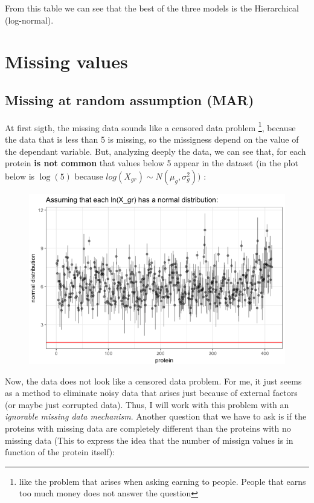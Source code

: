 \documentclass{article}
\begin{document}
From this table we can see that the best of the three models is the Hierarchical (log-normal).


\section{Missing values}
\subsection*{Missing at random assumption (MAR)}

At first sigth, the missing data sounds like a censored data problem \footnote{like the problem that arises when asking earning to people. People that earns too much money does not answer the question}, because the data that is less than 5 is missing, so the missigness depend on the value of the dependant variable. But, analyzing deeply the data, we can see that, for each protein \textbf{is not common} that values below 5 appear in the dataset (in the plot below is $\log(5)$ because $log(X_{gr}) \sim N(\mu_g, \sigma_g^2))$ :

\begin{figure}[ht!]
\centering
\includegraphics[width=12cm]{figures/missing.png}
\end{figure}

Now, the data does not look like a censored data problem. For me, it just seems as a method to eliminate noisy data that arises just because of external factors (or maybe just corrupted data). Thus, I will work with this problem with an \textit{ignorable missing data mechanism}. Another question that we have to ask is if the proteins with missing data are completely different than the proteins with no missing data (This to express the idea that the number of missign values is in function of the protein itself):
\end{document}
